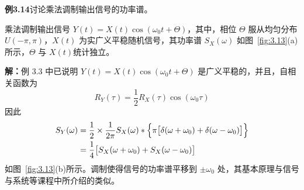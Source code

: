 \documentclass[11pt,openany,UTF8]{ctexbook}
\begin{document}
\begin{examplebox}
\textbf{例3.14}\quad 讨论乘法调制输出信号的功率谱\nobreak。

乘法调制输出信号 $Y(t)=X(t)\cos(\omega_0t+\Theta)$\nobreak，其中\nobreak，相位 $\Theta$ 服从均匀分布 $U(-\pi,\pi)$\nobreak，$X(t)$
为实广义平稳随机信号\nobreak，其功率谱 $S_X(\omega)$ 如图~\ref{fig:3.13}(a)所示\nobreak，$\Theta$ 与 $X(t)$统计独立\nobreak。

\textbf{解\nobreak：}\quad 例 3.3 中已说明 $Y(t)=X(t)\cos(\omega_0t+\Theta)$ 是广义平稳的\nobreak，并且\nobreak，自相关函数为
\[
R_Y(\tau)=\frac{1}{2}R_X(\tau)\cos(\omega_0\tau)
\]
因此
\[
\begin{aligned}
S_Y(\omega)&=\frac{1}{2}\times\frac{1}{2\pi}S_X(\omega)*\Bigl\{\pi\bigl[\delta(\omega+\omega_0)+\delta(\omega-\omega_0)\bigr]\Bigr\}\\
&=\frac{1}{4}\bigl[S_X(\omega+\omega_0)+S_X(\omega-\omega_0)\bigr]
\end{aligned}
\]
如图~\ref{fig:3.13}(b)所示\nobreak。调制使得信号的功率谱平移到 $\pm\omega_0$ 处\nobreak，其基本原理与信号与系统等课程中所介绍的类似\nobreak。


\end{examplebox}
\end{document}
